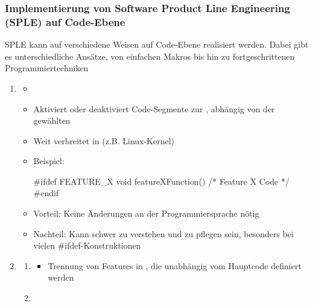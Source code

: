 \subsubsection*{Implementierung von Software Product Line Engineering (SPLE) auf Code-Ebene}
\begin{infoBox}
    SPLE kann auf verschiedene Weisen auf Code-Ebene realisiert werden. Dabei gibt es unterschiedliche Ansätze, von einfachen Makros bis hin zu fortgeschrittenen Programmiertechniken
\end{infoBox}
\begin{infoBox}[title=Methoden zur SPLE-Implementierung]
    \begin{enumerate}
        \item {}
        \begin{itemize}
            \item {}
            \item Aktiviert oder deaktiviert Code-Segmente zur , abhängig von der gewählten 
            \item Weit verbreitet in  (z.B. Linux-Kernel)
            \item Beispiel:
            \begin{codeBlock}{}
                #ifdef FEATURE_X
                    void featureXFunction() { /* Feature X Code */ }
                #endif
            \end{codeBlock}
            \item Vorteil: Keine Änderungen an der Programmiersprache nötig
            \item Nachteil: Kann schwer zu verstehen und zu pflegen sein, besonders bei vielen \#ifdef-Konstruktionen
        \end{itemize}
        \item {}
        \begin{enumerate}
            \item {}
            \begin{itemize}
                \item Trennung von Features in , die unabhängig vom Hauptcode definiert werden
            \end{itemize}
            \item {}

\end{enumerate}
\end{enumerate}
\end{infoBox}
